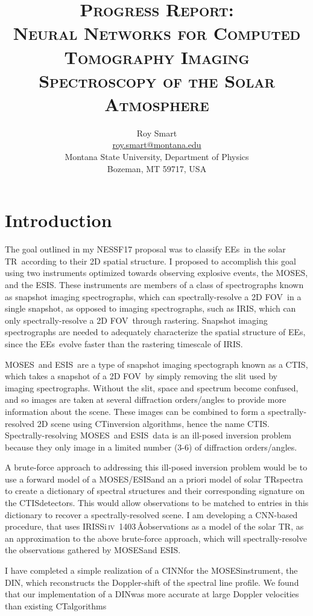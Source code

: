 \documentclass[10pt,letterpaper]{article}
\title{\textsc{Progress Report: \\ Neural Networks for Computed Tomography Imaging Spectroscopy of the Solar Atmosphere}}
\author{Roy Smart \\ \url{roy.smart@montana.edu} \\ Montana State University, Department of Physics \\ Bozeman, MT 59717, USA}
\newcommand{\SiIV}{Si\,\textsc{iv}~1403\,\AA}
\newcommand{\TR}{\ac{TR}}
\newcommand{\EEs}{\acp{EE}}
\newcommand{\CT}{\ac{CT}}
\newcommand{\CTIS}{\ac{CTIS}}
\newcommand{\MOSES}{\ac{MOSES}}
\newcommand{\ESIS}{\ac{ESIS}}
\newcommand{\FOV}{\ac{FOV}}
\newcommand{\CNN}{\ac{CNN}}
\newcommand{\CINN}{\ac{CINN}}
\newcommand{\DIN}{\ac{DIN}}
\newcommand{\IRIS}{\ac{IRIS}}
\begin{document}
	
	\maketitle
	
	\section{Introduction}
	
		The goal outlined in my NESSF17 proposal was to classify \EEs\ in the solar \TR\ according to their 2D spatial structure.
		I proposed to accomplish this goal using two instruments optimized towards observing explosive events, the \MOSES, and the \ESIS.
		These instruments are members of a class of spectrographs known as snapshot imaging spectrographs, which can spectrally-resolve a 2D \FOV\ in a single snapshot, as opposed to imaging spectrographs, such as \IRIS, which can only spectrally-resolve a 2D \FOV\ through rastering.
		Snapshot imaging spectrographs are needed to adequately characterize the spatial structure of \EEs, since the \EEs\ evolve faster than the rastering timescale of \IRIS.
		
		\MOSES\ and \ESIS\ are a type of snapshot imaging spectograph known as a \CTIS, which takes a snapshot of a 2D \FOV\ by simply removing the slit used by imaging spectrographs.
		Without the slit, space and spectrum become confused, and so images are taken at several diffraction orders/angles to provide more information about the scene.
		These images can be combined to form a spectrally-resolved 2D scene using \CT inversion algorithms, hence the name \CTIS.
		Spectrally-resolving \MOSES\ and \ESIS\ data is an ill-posed inversion problem because they only image in a limited number (3-6) of diffraction orders/angles.
		
		A brute-force approach to addressing this ill-posed inversion problem would be to use a forward model of a \MOSES/\ESIS and an a priori model of solar \TR spectra to create a dictionary of spectral structures and their corresponding signature on the \CTIS detectors.
		This would allow observations to be matched to entries in this dictionary to recover a spectrally-resolved scene.
		I am developing a \CNN-based procedure, that uses \IRIS \SiIV observations as a model of the solar \TR, as an approximation to the above brute-force approach, which will spectrally-resolve the observations gathered by \MOSES and \ESIS.
			
		I have completed a simple realization of a \CINN for the \MOSES instrument, the \DIN, which reconstructs the Doppler-shift of the spectral line profile.
		We found that our implementation of a \DIN was more accurate at large Doppler velocities than existing \CT algorithms 
		
\end{document}
